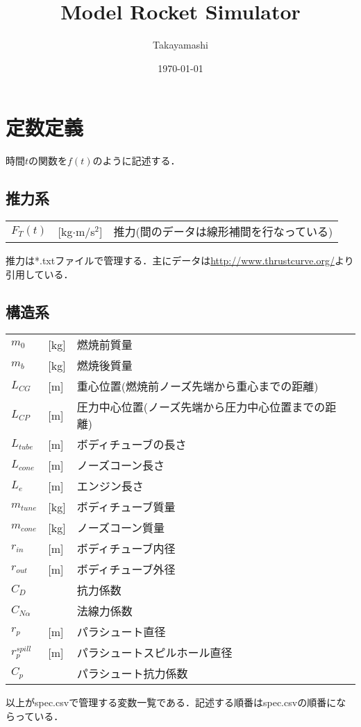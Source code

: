 \documentclass[a4paper]{jsarticle}
\title{Model Rocket Simulator}
\author{Takayamashi}
\date{\today}
\begin{document}
\maketitle
\section{定数定義}
時間$t$の関数を$f(t)$のように記述する．

\subsection{推力系}
\begin{tabular}{lll}
$ F_T(t)$ &[kg$\cdot$m/s$^2$] &推力(間のデータは線形補間を行なっている) \\
\end{tabular}

推力は*.txtファイルで管理する．主にデータは\url{http://www.thrustcurve.org/}より引用している．

\subsection{構造系}
\begin{tabular}{lll}
$m_0$ &[kg]&燃焼前質量\\
$m_b$ &[kg]&燃焼後質量\\
$L_{CG}$ &[m]&重心位置(燃焼前ノーズ先端から重心までの距離)\\
$L_{CP}$ &[m]&圧力中心位置(ノーズ先端から圧力中心位置までの距離)\\
$L_{tube}$ &[m]&ボディチューブの長さ \\
$L_{cone}$ &[m]&ノーズコーン長さ \\
$L_{e}$ &[m]&エンジン長さ \\
$m_{tune}$ &[kg]&ボディチューブ質量\\
$m_{cone}$ &[kg]&ノーズコーン質量\\
$r_{in}$ &[m]&ボディチューブ内径\\
$r_{out}$ &[m]&ボディチューブ外径\\
$C_D$ &&抗力係数\\
$C_{N \alpha}$ &&法線力係数\\
$r_p$ &[m]&パラシュート直径\\
$r_p^{spill}$ &[m]&パラシュートスピルホール直径\\
$C_p$ &&パラシュート抗力係数\\
\end{tabular}

以上がspec.csvで管理する変数一覧である．記述する順番はspec.csvの順番にならっている．
\end{document}
